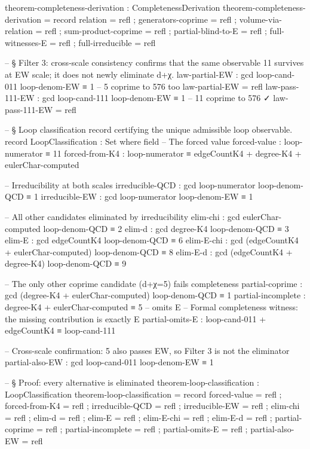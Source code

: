 \documentclass[11pt,a4paper]{book}
\begin{document}
\begin{code}
theorem-completeness-derivation : CompletenessDerivation
theorem-completeness-derivation = record
  { relation            = refl
  ; generators-coprime  = refl
  ; volume-via-relation = refl
  ; sum-product-coprime = refl
  ; partial-blind-to-E  = refl
  ; full-witnesses-E    = refl
  ; full-irreducible    = refl
  }

-- § Filter 3: cross-scale consistency confirms that the same observable 11 survives at EW scale; it does not newly eliminate d+χ.
law-partial-EW  : gcd loop-cand-011 loop-denom-EW ≡ 1   -- 5 coprime to 576 too
law-partial-EW  = refl
law-pass-111-EW : gcd loop-cand-111 loop-denom-EW ≡ 1   -- 11 coprime to 576 ✓
law-pass-111-EW = refl

-- § Loop classification record certifying the unique admissible loop observable.
record LoopClassification : Set where
  field
    -- The forced value
    forced-value        : loop-numerator ≡ 11
    forced-from-K4      : loop-numerator ≡ edgeCountK4 + degree-K4 + eulerChar-computed

    -- Irreducibility at both scales
    irreducible-QCD     : gcd loop-numerator loop-denom-QCD ≡ 1
    irreducible-EW      : gcd loop-numerator loop-denom-EW ≡ 1

    -- All other candidates eliminated by irreducibility
    elim-chi            : gcd eulerChar-computed loop-denom-QCD ≡ 2
    elim-d              : gcd degree-K4 loop-denom-QCD ≡ 3
    elim-E              : gcd edgeCountK4 loop-denom-QCD ≡ 6
    elim-E-chi          : gcd (edgeCountK4 + eulerChar-computed) loop-denom-QCD ≡ 8
    elim-E-d            : gcd (edgeCountK4 + degree-K4) loop-denom-QCD ≡ 9

    -- The only other coprime candidate (d+χ=5) fails completeness
    partial-coprime     : gcd (degree-K4 + eulerChar-computed) loop-denom-QCD ≡ 1
    partial-incomplete  : degree-K4 + eulerChar-computed ≡ 5  -- omits E
    -- Formal completeness witness: the missing contribution is exactly E
    partial-omits-E     : loop-cand-011 + edgeCountK4 ≡ loop-cand-111

    -- Cross-scale confirmation: 5 also passes EW, so Filter 3 is not the eliminator
    partial-also-EW     : gcd loop-cand-011 loop-denom-EW ≡ 1

-- § Proof: every alternative is eliminated
theorem-loop-classification : LoopClassification
theorem-loop-classification = record
  { forced-value        = refl
  ; forced-from-K4      = refl
  ; irreducible-QCD     = refl
  ; irreducible-EW      = refl
  ; elim-chi            = refl
  ; elim-d              = refl
  ; elim-E              = refl
  ; elim-E-chi          = refl
  ; elim-E-d            = refl
  ; partial-coprime     = refl
  ; partial-incomplete  = refl
  ; partial-omits-E     = refl
  ; partial-also-EW     = refl
  }


\end{code}
\end{document}
